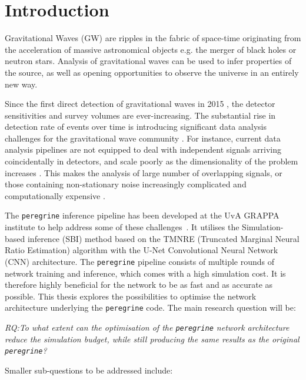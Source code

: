 \section{Introduction}
\label{sec:introduction}

Gravitational Waves (GW) are ripples in the fabric of space-time originating from the acceleration of massive astronomical objects e.g. the merger of black holes or neutron stars. 
Analysis of gravitational waves can be used to infer properties of the source, as well as opening opportunities to observe the universe in an entirely new way.

Since the first direct detection of gravitational waves in 2015 \cite{LIGO_2016}, the detector sensitivities and survey volumes are ever-increasing. The substantial rise in detection rate of events over time is introducing significant data analysis challenges for the gravitational wave community \cite{bhardwaj2023peregrine}.
For instance, current data analysis pipelines are not equipped to deal with independent signals arriving coincidentally in detectors, and scale poorly as the dimensionality of the problem increases \cite{alvey2023things}. This makes the analysis of large number of overlapping signals, or those containing non-stationary noise increasingly complicated and computationally expensive \cite{bhardwaj2023peregrine}.

The \texttt{peregrine} inference pipeline has been developed at the UvA GRAPPA institute to help address some of these challenges~\cite{bhardwaj2023peregrine}. It utilises the Simulation-based inference (SBI) method based on the TMNRE (Truncated Marginal Neural Ratio Estimation) algorithm with the U-Net Convolutional Neural Network (CNN) architecture. The \texttt{peregrine} pipeline consists of multiple rounds of network training and inference, which comes with a high simulation cost. It is therefore highly beneficial for the network to be as fast and as accurate as possible. This thesis explores the possibilities to optimise the network architecture underlying the \texttt{peregrine} code. The main research question will be: 

\noindent \textit{RQ:To what extent can the optimisation of the \texttt{peregrine} network architecture reduce the simulation budget, while still producing the same results as the original \texttt{peregrine}?}

Smaller sub-questions to be addressed include:


